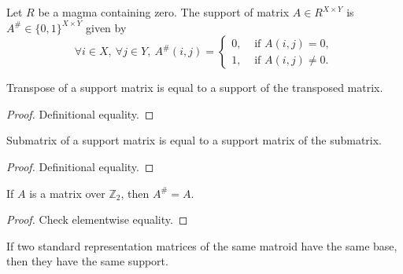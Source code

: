 
\begin{definition}
    \label{Matrix.support}
    \leanok
    Let $R$ be a magma containing zero. The support of matrix $A \in R^{X \times Y}$ is $A^{\#} \in \{0, 1\}^{X \times Y}$ given by
    \[
        \forall i \in X, \ \forall j \in Y, \ A^{\#} (i, j) = \begin{cases}
            0, & \text{ if } A (i, j) = 0, \\
            1, & \text{ if } A (i, j) \neq 0.
        \end{cases}
    \]
\end{definition}

\begin{lemma}
    \label{Matrix.support_transpose}
    \leanok
    Transpose of a support matrix is equal to a support of the transposed matrix.
\end{lemma}

\begin{proof}
    \leanok
    Definitional equality.
\end{proof}

\begin{lemma}
    \label{Matrix.support_submatrix}
    \leanok
    Submatrix of a support matrix is equal to a support matrix of the submatrix.
\end{lemma}

\begin{proof}
    \leanok
    Definitional equality.
\end{proof}

\begin{lemma}
    \label{Matrix.support_Z2}
    \leanok
    If $A$ is a matrix over $\mathbb{Z}_{2}$, then $A^{\#} = A$.
\end{lemma}

\begin{proof}
    \leanok
    Check elementwise equality.
\end{proof}

\begin{lemma}
    \label{support_eq_support_of_same_matroid_same_X}
    \leanok
    If two standard representation matrices of the same matroid have the same base, then they have the same support.
\end{lemma}

